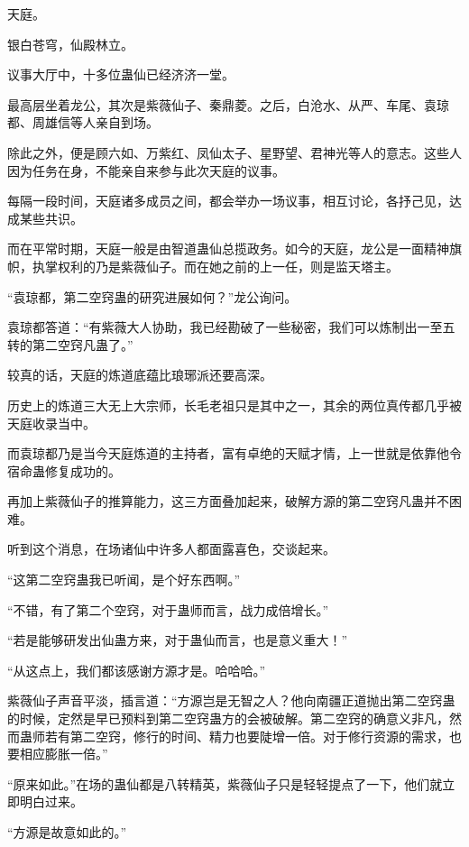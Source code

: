 
\begin{this_body}

天庭。

银白苍穹，仙殿林立。

议事大厅中，十多位蛊仙已经济济一堂。

最高层坐着龙公，其次是紫薇仙子、秦鼎菱。之后，白沧水、从严、车尾、袁琼都、周雄信等人亲自到场。

除此之外，便是顾六如、万紫红、凤仙太子、星野望、君神光等人的意志。这些人因为任务在身，不能亲自来参与此次天庭的议事。

每隔一段时间，天庭诸多成员之间，都会举办一场议事，相互讨论，各抒己见，达成某些共识。

而在平常时期，天庭一般是由智道蛊仙总揽政务。如今的天庭，龙公是一面精神旗帜，执掌权利的乃是紫薇仙子。而在她之前的上一任，则是监天塔主。

“袁琼都，第二空窍蛊的研究进展如何？”龙公询问。

袁琼都答道：“有紫薇大人协助，我已经勘破了一些秘密，我们可以炼制出一至五转的第二空窍凡蛊了。”

较真的话，天庭的炼道底蕴比琅琊派还要高深。

历史上的炼道三大无上大宗师，长毛老祖只是其中之一，其余的两位真传都几乎被天庭收录当中。

而袁琼都乃是当今天庭炼道的主持者，富有卓绝的天赋才情，上一世就是依靠他令宿命蛊修复成功的。

再加上紫薇仙子的推算能力，这三方面叠加起来，破解方源的第二空窍凡蛊并不困难。

听到这个消息，在场诸仙中许多人都面露喜色，交谈起来。

“这第二空窍蛊我已听闻，是个好东西啊。”

“不错，有了第二个空窍，对于蛊师而言，战力成倍增长。”

“若是能够研发出仙蛊方来，对于蛊仙而言，也是意义重大！”

“从这点上，我们都该感谢方源才是。哈哈哈。”

紫薇仙子声音平淡，插言道：“方源岂是无智之人？他向南疆正道抛出第二空窍蛊的时候，定然是早已预料到第二空窍蛊方的会被破解。第二空窍的确意义非凡，然而蛊师若有第二空窍，修行的时间、精力也要陡增一倍。对于修行资源的需求，也要相应膨胀一倍。”

“原来如此。”在场的蛊仙都是八转精英，紫薇仙子只是轻轻提点了一下，他们就立即明白过来。

“方源是故意如此的。”


\end{this_body}
